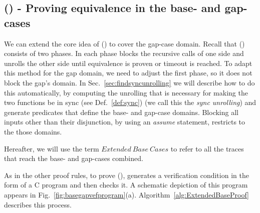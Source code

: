 \subsection{() - Proving equivalence in the base- and gap-cases}\label{sec:SIMPLE-BASE-EQUIV}
We can extend the core idea of () to cover the gap-case domain. Recall that () consists of two phases. In each phase  blocks the recursive calls of one side and unrolls the other side until equivalence is proven or timeout is reached. To adapt this method for the gap domain, we need to adjust the first phase, so it does not block the gap's domain. In Sec.~\ref{sec:findsyncunrolling} we will describe how to do this automatically, by computing the unrolling that is necessary for making the two functions be in sync (see Def.~\ref{def:sync}) (we call this the \emph{sync unrolling}) and generate predicates that define the base- and gap-case domains. Blocking all inputs other than their disjunction, by using an \emph{assume} statement, restricts  to the those domains. 

Hereafter, we will use the term $Extended\ Base\ Cases$ to refer to all the traces that reach the base- and gap-cases combined. 

As in the other proof rules, to prove (),  generates a verification condition in the form of a C program and then checks it. A schematic depiction of this program appears in Fig.~\ref{fig:basegapvefprogram}(a). Algorithm~\ref{alg:ExtendedBaseProof} describes this process. 

